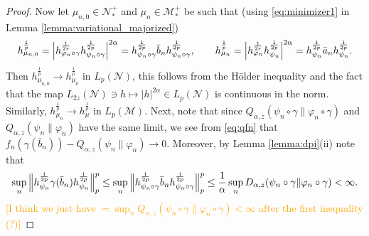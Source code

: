 \documentclass[12pt]{article}
\theoremstyle{definition}
\theoremstyle{remark}
\numberwithin{equation}{section}
\def\Me{\mathcal M}
\def\Ne{\mathcal N}
\def\ffi{\varphi}
\begin{document}
\begin{proof}
Now let $\mu_{n,0}\in \Ne_*^+$ and $\mu_n\in \Me_*^+$ be such that (using  \eqref{eq:minimizer1}
in Lemma \ref{lemma:variational_majorized})
\begin{align*}
h_{\mu_{n,0}}^{\frac 1p}=
\Big|h_{\ffi_n\circ\gamma}^{1\over 2r}h_{\psi_n\circ\gamma}^{1\over 2p}\Big|^{2\alpha}=
h_{\psi_n\circ\gamma}^{\frac 1{2p}}\bar b_{n}
h_{\psi_n\circ\gamma}^{\frac1{2p}},\qquad
h_{\mu_{n}}^{\frac1p}=\Big|h_{\ffi_n}^{1\over 2r}h_{\psi_n}^{1\over 2p}\Big|^{2\alpha}=
h_{\psi_n}^{\frac 1{2p}}\bar a_{n}h_{\psi_n}^{\frac1{2p}}. 
\end{align*}
Then $h_{\mu_{n,0}}^{\frac1p}\to h_{\mu_0}^{\frac1p}$ in $L_p(\Ne)$, this follows from the H\"older
inequality and the fact \cite{kosaki1984applicationsuc} that the map
$L_{2z}(\Ne)\ni h\mapsto |h|^{2\alpha}\in L_p(\Ne)$ is continuous in the norm. Similarly,
$h_{\mu_n}^{\frac1p}\to h_\mu^{\frac1p}$ in $L_p(\Me)$. 
Next, note that since
$Q_{\alpha,z}(\psi_n\circ\gamma\|\ffi_n\circ\gamma)$ and $Q_{\alpha,z}(\psi_n\|\ffi_n)$
have the same limit, we see from \eqref{eq:qfn} that
$f_n(\gamma(\bar b_{n}))-Q_{\alpha,z}(\psi_n\|\ffi_n)\to0$.
{\color{red}Moreover, by Lemma \ref{lemma:dpi}(ii) note that
\[
\sup_n\Big\|h_{\psi_n}^{\frac 1{2p}}\gamma(\bar b_{n})h_{\psi_n}^{1\over 2p}\Big\|_p^p
\le\sup_n\Big\|h_{\psi_n\circ\gamma}^{\frac 1{2p}}\bar b_{n}
h_{\psi_n\circ\gamma}^{\frac 1{2p}}\Big\|_p^p
\le{1\over\alpha}\sup_nD_{\alpha,z}(\psi_n\circ\gamma\|\ffi_n\circ\gamma)<\infty.
\]}
\textcolor{orange}{[I think we just have
$=\sup_nQ_{\alpha,z}(\psi_n\circ\gamma\|\ffi_n\circ\gamma)<\infty$ after the first
inequality (?)]}


\end{proof}
\end{document}

